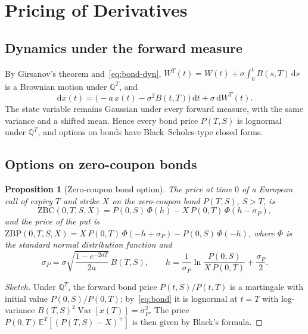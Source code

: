 \documentclass[11pt,a4paper]{article}
\theoremstyle{plain}
\newtheorem{proposition}[theorem]{Proposition}
\theoremstyle{definition}
\newcommand{\dd}{\mathrm{d}}
\newcommand{\E}{\mathbb{E}}
\newcommand{\Q}{\mathbb{Q}}
\DeclareMathOperator{\Var}{Var}
\begin{document}
\clearpage
\section{Pricing of Derivatives}
\label{sec:pricing}

\subsection{Dynamics under the forward measure}
By Girsanov's theorem and~\eqref{eq:bond-dyn}, $W^T(t)=W(t)+\sigma\int_0^tB(s,T)\,\dd s$ is a Brownian motion under $\Q^T$, and
\begin{equation}
    \dd x(t)=\bigl(-a\,x(t)-\sigma^2B(t,T)\bigr)\,\dd t+\sigma\,\dd W^T(t).
    \label{eq:x-forward}
\end{equation}
The state variable remains Gaussian under every forward measure, with the same variance and a shifted mean. Hence every bond price $P(T,S)$ is lognormal under $\Q^T$, and options on bonds have Black--Scholes-type closed forms.

\subsection{Options on zero-coupon bonds}
\begin{proposition}[Zero-coupon bond option]\label{prop:zbo}
The price at time $0$ of a European call of expiry $T$ and strike $X$ on the zero-coupon bond $P(T,S)$, $S>T$, is
\begin{equation}
    \mathrm{ZBC}(0,T,S,X)=P(0,S)\,\Phi(h)-X\,P(0,T)\,\Phi(h-\sigma_P),
    \label{eq:zbc}
\end{equation}
and the price of the put is $\mathrm{ZBP}(0,T,S,X)=X\,P(0,T)\,\Phi(-h+\sigma_P)-P(0,S)\,\Phi(-h)$, where $\Phi$ is the standard normal distribution function and
\begin{equation}
    \sigma_P=\sigma\sqrt{\frac{1-e^{-2aT}}{2a}}\,B(T,S),
    \qquad
    h=\frac{1}{\sigma_P}\ln\frac{P(0,S)}{X\,P(0,T)}+\frac{\sigma_P}{2}.
    \label{eq:sigmap}
\end{equation}
\end{proposition}
\begin{proof}[Sketch]
Under $\Q^T$, the forward bond price $P(t,S)/P(t,T)$ is a martingale with initial value $P(0,S)/P(0,T)$; by~\eqref{eq:bond} it is lognormal at $t=T$ with log-variance $B(T,S)^2\Var[x(T)]=\sigma_P^2$. The price $P(0,T)\,\E^T[(P(T,S)-X)^+]$ is then given by Black's formula.
\end{proof}
\end{document}
